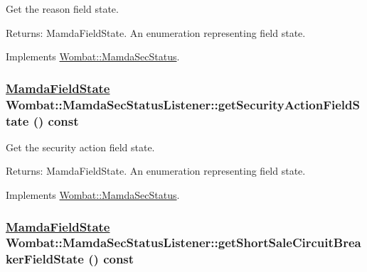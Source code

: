 Get the reason field state. 

\begin{Desc}
\item[Returns:]Mamda\-Field\-State. An enumeration representing field state. \end{Desc}


Implements \hyperlink{classWombat_1_1MamdaSecStatus_63fcfbc175a0bab1fcf500007b831974}{Wombat::Mamda\-Sec\-Status}.\hypertarget{classWombat_1_1MamdaSecStatusListener_3a220f61dbc73b122840f7f3986d2b9c}{
\subsubsection[getSecurityActionFieldState]{\setlength{\rightskip}{0pt plus 5cm}\hyperlink{namespaceWombat_93aac974f2ab713554fd12a1fa3b7d2a}{Mamda\-Field\-State} Wombat::Mamda\-Sec\-Status\-Listener::get\-Security\-Action\-Field\-State () const}}
\label{classWombat_1_1MamdaSecStatusListener_3a220f61dbc73b122840f7f3986d2b9c}


Get the security action field state. 

\begin{Desc}
\item[Returns:]Mamda\-Field\-State. An enumeration representing field state. \end{Desc}


Implements \hyperlink{classWombat_1_1MamdaSecStatus_771481bb771bdd1bb86ab54be9e9247b}{Wombat::Mamda\-Sec\-Status}.\hypertarget{classWombat_1_1MamdaSecStatusListener_a6bf492643a4963d80cdc05134955358}{
\subsubsection[getShortSaleCircuitBreakerFieldState]{\setlength{\rightskip}{0pt plus 5cm}\hyperlink{namespaceWombat_93aac974f2ab713554fd12a1fa3b7d2a}{Mamda\-Field\-State} Wombat::Mamda\-Sec\-Status\-Listener::get\-Short\-Sale\-Circuit\-Breaker\-Field\-State () const}}
\label{classWombat_1_1MamdaSecStatusListener_a6bf492643a4963d80cdc05134955358}



